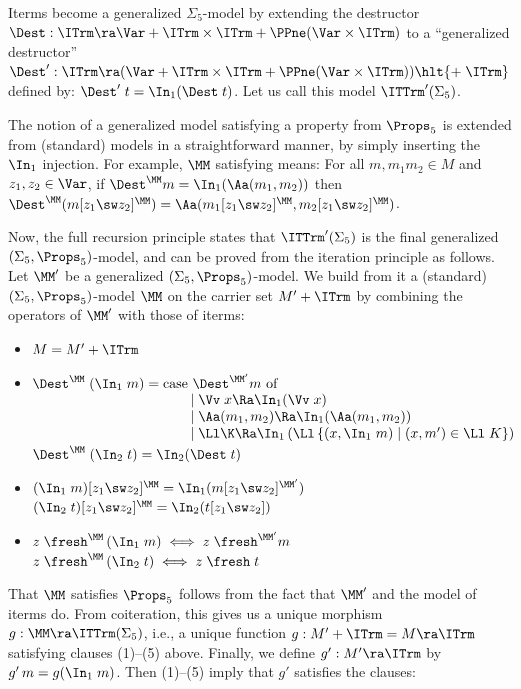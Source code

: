 Iterms become a generalized $\Sigma_5$-model by extending the destructor $\Dest : \ITrm \ra \Var + 
\ITrm \times \ITrm + \PPne(\Var\times \ITrm)$ to a ``generalized destructor''
$\Dest' : \ITrm \ra (\Var + 
\ITrm \times \ITrm + \PPne(\Var\times \ITrm)) \hlt{+\;\ITrm}$ defined by:
$\Dest'\;t = \In_1(\Dest\;t)$. Let us call this model $\ITTrm'(\Sigma_5)$. 

The notion of a generalized model satisfying a property from $\Props_5$ is extended from (standard) models in a straightforward manner, by simply inserting the $\In_1$ injection. For example, $\MM$ satisfying \ISwAp{} means: For all $m,m_1m_2\in M$ and $z_1,z_2\in\Var$, if $\Dest^\MM m = \In_1(\Aa(m_1,m_2))$ then 
$\Dest^\MM(m[z_1 \sw z_2]^\MM) = \Aa(m_1[z_1 \sw z_2]^\MM,m_2[z_1 \sw z_2]^\MM)$. 

Now, the full recursion principle states that $\ITTrm'(\Sigma_5)$ is the final generalized 
$(\Sigma_5,\Props_5)$-model, and can be proved from the iteration principle as follows. Let $\MM'$ be a generalized $(\Sigma_5,\Props_5)$-model. We build from it a (standard) $(\Sigma_5,\Props_5)$-model $\MM$ 
on the carrier set $M' + \ITrm$ 
by combining the operators of $\MM'$ with those of iterms: 
\begin{itemize}
	\item $M = M' + \ITrm$
	\item $\Dest^\MM\;(\In_1\;m) = \mbox{case $\Dest^{\MM'} m$ of}$
    \\$\begin{array}{l}
		\hspace*{25ex}\mid \Vv\;x \Ra \In_1(\Vv\;x) 
		\\
		\hspace*{25ex}\mid \Aa(m_1,m_2) \Ra \In_1(\Aa(m_1,m_2)) 
		\\
		\hspace*{25ex}\mid \Ll\K \Ra \In_1\,(\Ll\,\{(x,\In_1\;m) \mid (x,m') \in \Ll\;K\})
	\end{array} 
  $
  \\
  $\Dest^\MM\;(\In_2\;t) = \In_2(\Dest\;t)$
  \item $(\In_1\;m)[z_1\sw z_2]^\MM = \In_1(m [z_1\sw z_2]^{\MM'})$
  \hspace*{5ex}$(\In_2\;t)[z_1\sw z_2]^\MM = \In_2(t [z_1\sw z_2])$
   \item $z\;\fresh^\MM\,(\In_1\;m) \iff z\;\fresh^{\MM'} m $
  \hspace*{16ex}
    $z\;\fresh^\MM\,(\In_2\;t) \iff z\;\fresh\;t$
\end{itemize}
%
That $\MM$ satisfies $\Props_5$ follows from the fact that $\MM'$ and the model of iterms do. From coiteration, this gives us a unique morphism $g : \MM \ra \ITTrm(\Sigma_5)$, i.e., a unique function $g: M' + \ITrm = M \ra \ITrm$ satisfying clauses (1)--(5) above. Finally, we define $g': M' \ra \ITrm$ by $g'\,m = g(\In_1\;m)$. Then (1)--(5) imply that $g'$ satisfies the clauses:
